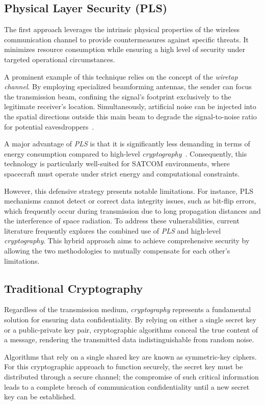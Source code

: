 \documentclass[11pt,a4paper]{report}
\begin{document}
\subsection{Physical Layer Security (PLS)}
The first approach leverages the intrinsic physical properties of the wireless communication channel to provide countermeasures against specific threats. 
It minimizes resource consumption while ensuring a high level of security under targeted operational circumstances.

A prominent example of this technique relies on the concept of the \textit{wiretap channel}. 
By employing specialized beamforming antennas, the sender can focus the transmission beam, confining the signal's footprint exclusively to the legitimate receiver's location. 
Simultaneously, artificial noise can be injected into the spatial directions outside this main beam to degrade the signal-to-noise ratio for potential eavesdroppers~\cite[p.~3--4]{PLS}.

A major advantage of \textit{PLS} is that it is significantly less demanding in terms of energy consumption compared to high-level \textit{cryptography}~\cite[p.~2]{PLS}. 
Consequently, this technology is particularly well-suited for SATCOM environments, where spacecraft must operate under strict energy and computational constraints.

However, this defensive strategy presents notable limitations. For instance, PLS mechanisms cannot detect or correct data integrity issues, such as bit-flip errors, 
which frequently occur during transmission due to long propagation distances and the interference of space radiation. 
To address these vulnerabilities, current literature frequently explores the combined use of \textit{PLS} and high-level \textit{cryptography}. 
This hybrid approach aims to achieve comprehensive security by allowing the two methodologies to mutually compensate for each other's limitations.

\subsection{Traditional Cryptography}
Regardless of the transmission medium, \textit{cryptography} represents a fundamental solution for ensuring data confidentiality. 
By relying on either a single secret key or a public-private key pair, cryptographic algorithms conceal the true content of a message, 
rendering the transmitted data indistinguishable from random noise.

Algorithms that rely on a single shared key are known as symmetric-key ciphers. 
For this cryptographic approach to function securely, the secret key must be distributed through a secure channel; 
the compromise of such critical information leads to a complete breach of communication confidentiality until a new secret key can be established.
\end{document}
